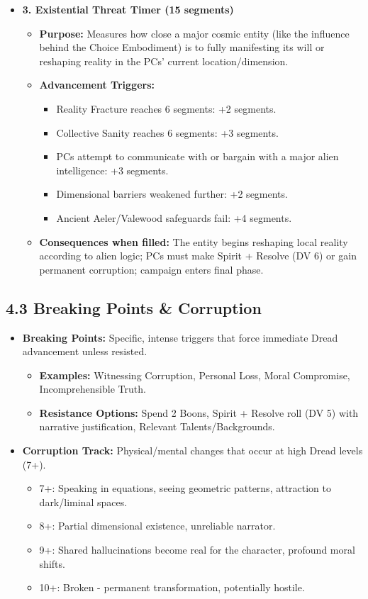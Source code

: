 \documentclass[11pt]{article}
\begin{document}
\begin{itemize}
\item \textbf{3. Existential Threat Timer (15 segments)}
\begin{itemize}
\item \textbf{Purpose:} Measures how close a major cosmic entity (like the influence behind the Choice Embodiment) is to fully manifesting its will or reshaping reality in the PCs' current location/dimension.
\item \textbf{Advancement Triggers:}
\begin{itemize}
\item Reality Fracture reaches 6 segments: +2 segments.
\item Collective Sanity reaches 6 segments: +3 segments.
\item PCs attempt to communicate with or bargain with a major alien intelligence: +3 segments.
\item Dimensional barriers weakened further: +2 segments.
\item Ancient Aeler/Valewood safeguards fail: +4 segments.
\end{itemize}
\item \textbf{Consequences when filled:} The entity begins reshaping local reality according to alien logic; PCs must make Spirit + Resolve (DV 6) or gain permanent corruption; campaign enters final phase.
\end{itemize}
\end{itemize}

\clearpage

\subsection*{4.3 Breaking Points \& Corruption}

\begin{itemize}
\item \textbf{Breaking Points:} Specific, intense triggers that force immediate Dread advancement unless resisted.
\begin{itemize}
\item \textbf{Examples:} Witnessing Corruption, Personal Loss, Moral Compromise, Incomprehensible Truth.
\item \textbf{Resistance Options:} Spend 2 Boons, Spirit + Resolve roll (DV 5) with narrative justification, Relevant Talents/Backgrounds.
\end{itemize}
\item \textbf{Corruption Track:} Physical/mental changes that occur at high Dread levels (7+).
\begin{itemize}
\item 7+: Speaking in equations, seeing geometric patterns, attraction to dark/liminal spaces.
\item 8+: Partial dimensional existence, unreliable narrator.
\item 9+: Shared hallucinations become real for the character, profound moral shifts.
\item 10+: Broken - permanent transformation, potentially hostile.
\end{itemize}
\end{itemize}
\end{document}
